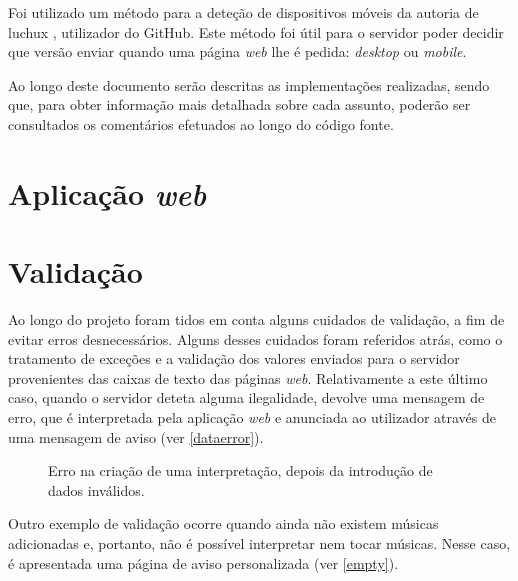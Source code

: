 \documentclass{report}
\begin{document}
Foi utilizado um método para a deteção de dispositivos móveis da autoria de luchux \cite{luchux}, utilizador do GitHub. Este método foi útil para o servidor poder decidir que versão enviar quando uma página \emph{web} lhe é pedida: \emph{desktop} ou \emph{mobile}.

Ao longo deste documento serão descritas as implementações realizadas, sendo que, para obter informação mais detalhada sobre cada assunto, poderão ser consultados os comentários efetuados ao longo do código fonte.

\chapter{Aplicação \emph{web}}
\label{chap.aplicacao}













\chapter{Validação}
\label{chap.validacao}
Ao longo do projeto foram tidos em conta alguns cuidados de validação, a fim de evitar erros desnecessários. Alguns desses cuidados foram referidos atrás, como o tratamento de exceções e a validação dos valores enviados para o servidor provenientes das caixas de texto das páginas \emph{web}. Relativamente a este último caso, quando o servidor deteta alguma ilegalidade, devolve uma mensagem de erro, que é interpretada pela aplicação \emph{web} e anunciada ao utilizador através de uma mensagem de aviso (ver \autoref{dataerror}).

\begin{figure}[htp]
\centering
{}
\caption{Erro na criação de uma interpretação, depois da introdução de dados inválidos.}
\label{dataerror}
\end{figure}

Outro exemplo de validação ocorre quando ainda não existem músicas adicionadas e, portanto, não é possível interpretar nem tocar músicas. Nesse caso, é apresentada uma página de aviso personalizada (ver \autoref{empty}).
\end{document}

